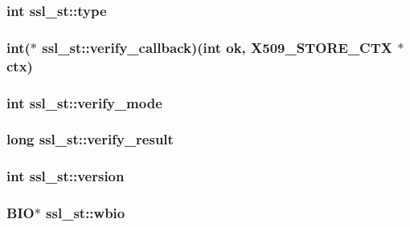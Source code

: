 \hypertarget{structssl__st_a5d2a229f22c169bd5eecefd9f017e089}{
\subsubsection[{type}]{\setlength{\rightskip}{0pt plus 5cm}int ssl\-\_\-st\-::type}}\label{structssl__st_a5d2a229f22c169bd5eecefd9f017e089}
\hypertarget{structssl__st_a82f95e0f633b3fefa717fc5b04ca81e9}{
\subsubsection[{verify\-\_\-callback}]{\setlength{\rightskip}{0pt plus 5cm}int($\ast$ ssl\-\_\-st\-::verify\-\_\-callback)(int ok, X509\-\_\-\-S\-T\-O\-R\-E\-\_\-\-C\-T\-X $\ast${\bf ctx})}}\label{structssl__st_a82f95e0f633b3fefa717fc5b04ca81e9}
\hypertarget{structssl__st_a7592fd603fe469b789f13bdbc55a172e}{
\subsubsection[{verify\-\_\-mode}]{\setlength{\rightskip}{0pt plus 5cm}int ssl\-\_\-st\-::verify\-\_\-mode}}\label{structssl__st_a7592fd603fe469b789f13bdbc55a172e}
\hypertarget{structssl__st_a3092706c43455cf6a410853d90aadb1f}{
\subsubsection[{verify\-\_\-result}]{\setlength{\rightskip}{0pt plus 5cm}long ssl\-\_\-st\-::verify\-\_\-result}}\label{structssl__st_a3092706c43455cf6a410853d90aadb1f}
\hypertarget{structssl__st_a104b2a57e68e7e8c228c34d9ffb0e3dd}{
\subsubsection[{version}]{\setlength{\rightskip}{0pt plus 5cm}int ssl\-\_\-st\-::version}}\label{structssl__st_a104b2a57e68e7e8c228c34d9ffb0e3dd}
\hypertarget{structssl__st_a81a174cdc5f516202537ff6fef6680ed}{
\subsubsection[{wbio}]{\setlength{\rightskip}{0pt plus 5cm}B\-I\-O$\ast$ ssl\-\_\-st\-::wbio}}\label{structssl__st_a81a174cdc5f516202537ff6fef6680ed}
